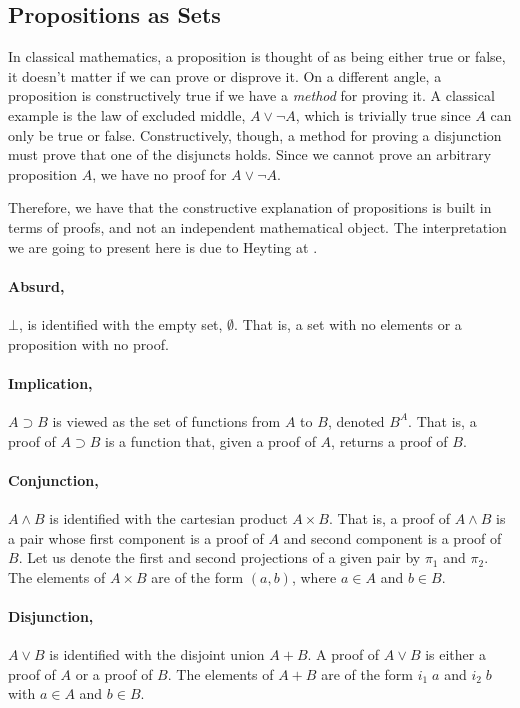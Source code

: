 \subsection{Propositions as Sets}
\label{subsec:martinlof:propositionsassets}

In classical mathematics, a proposition is thought of as being either true or false, it doesn't
matter if we can prove or disprove it. On a different angle, a proposition is constructively true
if we have a \emph{method} for proving it. A classical example is the law of excluded middle, $A \vee \neg A$,
which is trivially true since $A$ can only be true or false. Constructively, though, a method for proving a disjunction
must prove that one of the disjuncts holds. Since we cannot prove an arbitrary proposition $A$, we have
no proof for $A \vee \neg A$. 

Therefore, we have that the constructive explanation of propositions is built in terms of proofs, and
not an independent mathematical object. The interpretation we are going to present here is due
to Heyting at \cite{Heyting71}.

\paragraph{Absurd,} $\bot$, is identified with the empty set, $\emptyset$. That is, a set with no elements
or a proposition with no proof.

\paragraph{Implication,} $A \supset B$ is viewed as the set of functions from $A$ to $B$, denoted $B^A$. That is,
a proof of $A \supset B$ is a function that, given a proof of $A$, returns a proof of $B$.

\newcommand{\pone}{\pi_1}
\newcommand{\ptwo}{\pi_2}
\paragraph{Conjunction,} $A \wedge B$ is identified with the cartesian product $A \times B$. That is, a proof
of $A \wedge B$ is a pair whose first component is a proof of $A$ and second component is a proof of $B$.
Let us denote the first and second projections of a given pair by $\pone$ and $\ptwo$.
The elements of $A \times B$ are of the form $(a, b)$, where $a \in A$ and $b \in B$.

\newcommand{\ione}{i_1}
\newcommand{\itwo}{i_2}
\paragraph{Disjunction,} $A \vee B$ is identified with the disjoint union $A + B$. A proof
of $A \vee B$ is either a proof of $A$ or a proof of $B$. The elements of $A + B$ are of the
form $\ione\; a$ and $\itwo\; b$ with $a \in A$ and $b \in B$.

